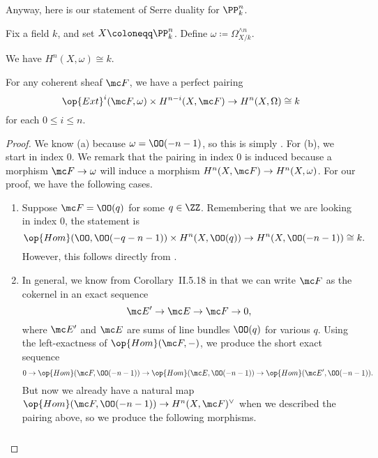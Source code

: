 \documentclass[../notes.tex]{subfiles}
\begin{document}
Anyway, here is our statement of Serre duality for $\PP^n_k$.
\begin{theorem}
	Fix a field $k$, and set $X\coloneqq\PP^n_k$. Define $\omega\coloneqq\Omega_{X/k}^{\land n}$.
	\begin{listalph}
		\item We have $H^n(X,\omega)\cong k$.
		\item For any coherent sheaf $\mc F$, we have a perfect pairing
		\[\op{Ext}^i(\mc F,\omega)\times H^{n-i}(X,\mc F)\to H^n(X,\Omega)\cong k\]
		for each $0\le i\le n$.
	\end{listalph}
\end{theorem}
\begin{proof}
	We know (a) because $\omega=\OO(-n-1)$, so this is simply . For (b), we start in index $0$. We remark that the pairing in index $0$ is induced because a morphism $\mc F\to\omega$ will induce a morphism $H^n(X,\mc F)\to H^n(X,\omega)$. For our proof, we have the following cases.
	\begin{enumerate}
		\item Suppose $\mc F=\OO(q)$ for some $q\in\ZZ$. Remembering that we are looking in index $0$, the statement is
		\[\op{Hom}(\OO,\OO(-q-n-1))\times H^n(X,\OO(q))\to H^n(X,\OO(-n-1))\cong k.\]
		However, this follows directly from .
		\item In general, we know from Corollary~II.5.18 in \cite{hartshorne} that we can write $\mc F$ as the cokernel in an exact sequence
		\[\mc E'\to\mc E\to\mc F\to0,\]
		where $\mc E'$ and $\mc E$ are sums of line bundles $\OO(q)$ for various $q$. Using the left-exactness of $\op{Hom}(\mc F,-)$, we produce the short exact sequence
		\[0\to\op{Hom}(\mc F,\OO(-n-1))\to\op{Hom}(\mc E,\OO(-n-1))\to\op{Hom}(\mc E',\OO(-n-1)).\]
		But now we already have a natural map $\op{Hom}(\mc F,\OO(-n-1))\to H^n(X,\mc F)^\lor$ when we described the pairing above, so we produce the following morphisms.
		\[\begin{tikzcd}

\end{tikzcd}\]
\end{enumerate}
\end{proof}
\end{document}
